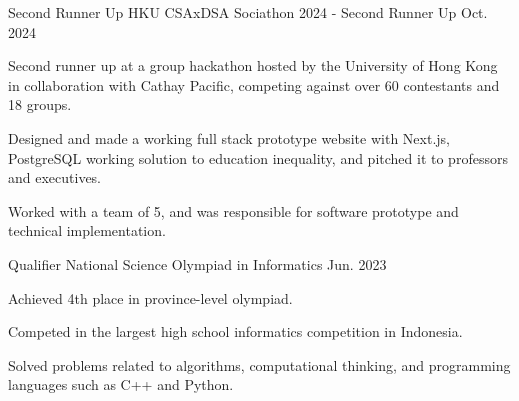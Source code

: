 
\begin{cventries}

  \cventry
    {Second Runner Up} %
    {HKU CSAxDSA Sociathon 2024 - Second Runner Up} %
    {} 
    {Oct. 2024} %
    {
      \begin{cvitems} %
        \item {Second runner up at a group hackathon hosted by the University of Hong Kong in collaboration with Cathay
Pacific, competing against over 60 contestants and 18 groups.}
        \item {Designed and made a working full stack prototype website with Next.js, PostgreSQL working solution to
education inequality, and pitched it to professors and executives.}
        \item {Worked with a team of 5, and was responsible for software prototype and technical implementation.}
      \end{cvitems}
    }
  
  \cventry
    {Qualifier} %
    {National Science Olympiad in Informatics} %
    {} 
    {Jun. 2023} %
    {
      \begin{cvitems} %
        \item {Achieved 4th place in province-level olympiad.}
        \item {Competed in the largest high school informatics competition in Indonesia.}
        \item {Solved problems related to algorithms, computational thinking, and programming languages such as C++ and
Python.}
      \end{cvitems}
    } 
  \end{cventries}
    
  

  



